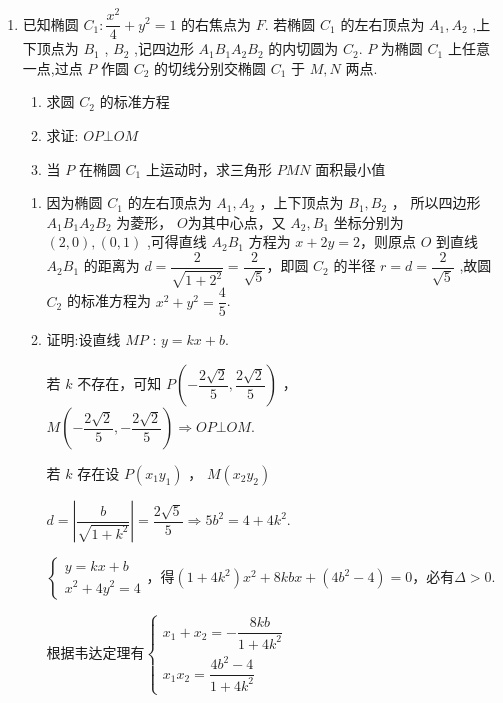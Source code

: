 \begin{enumerate}
\begin{jieda}
\begin{enumerate}
        \end{enumerate}
    \end{jieda}
    \item 已知椭圆 ${C}_1 : \dfrac{{x}^2}{4} + {y}^2 = 1$ 的右焦点为 $F$. 若椭圆 ${C}_1$ 的左右顶点为 ${A}_1,{A}_2$ ,上下顶点为 ${B}_1$ , ${B}_2$ ,记四边形 ${A}_1{B}_1{A}_2{B}_2$ 的内切圆为 ${C}_{2}$. $P$ 为椭圆 ${C}_1$ 上任意一点,过点 $P$ 作圆 ${C}_2$ 的切线分别交椭圆 ${C}_1$ 于 $M,N$ 两点.
    \begin{enumerate}
        \item 求圆 ${C}_2$ 的标准方程
        \item 求证: ${OP} \bot  {OM}$ 
        \item 当 $P$ 在椭圆 ${C}_1$ 上运动时，求三角形 ${PMN}$ 面积最小值
    \end{enumerate}
    \begin{jieda}
        \begin{enumerate}
            \item 因为椭圆 ${C}_1$ 的左右顶点为 ${A}_1,{A}_2$ ，上下顶点为 ${B}_1,{B}_2$ ， 所以四边形 ${A}_1{B}_1{A}_2{B}_2$ 为菱形， $O$为其中心点，又 ${A}_2,{B}_1$ 坐标分别为 $\left( {2,0}\right) ,\left( {0,1}\right)$ ,可得直线 ${A}_2{B}_1$ 方程为 $x + {2y} = 2$，则原点 $O$ 到直线 ${A}_2{B}_1$ 的距离为 $d = \dfrac{2}{\sqrt{1 + {2}^2}} = \dfrac{2}{\sqrt{5}}$，即圆 ${C}_2$ 的半径 $r = d = \dfrac{2}{\sqrt{5}}$ ,故圆 ${C}_2$ 的标准方程为 ${x}^2 + {y}^2 = \dfrac{4}{5}$.
            \item 证明:设直线 ${MP}$ : $y = {kx} + b$. 
            
            若 $k$ 不存在，可知 $P\left( {-\dfrac{2\sqrt{2} }{5},\dfrac{2\sqrt{2} }{5}}\right)$ ， $M\left( {-\dfrac{2\sqrt{2} }{5}, - \dfrac{2\sqrt{2}}{5}}\right)  \Longrightarrow  {OP}\bot {OM}$. 
            
            若 $k$ 存在设 $P\left( {{x}_1{y}_1}\right)$ ， $M\left( {{x}_2{y}_2}\right)$
            
            $d= \left| \dfrac{b}{\sqrt{1 + {k}^2}}\right|  = \dfrac{2\sqrt{5}}{5} \Longrightarrow  5{b}^2 = 4 + 4{k}^{2}.$
            
            $\left\{  \begin{array}{l} 
                y = {kx} + b \\  
                {x}^{2} + 4{y}^{2} = 4
            \end{array}\right.$，得$(1+4k^2)x^2 + 8kbx + \left( {4{b}^{2} - 4}\right) = 0$，必有$\Delta > 0.$
            
            根据韦达定理有$\left\{  \begin{matrix} {x}_1 + {x}_2 =  - \dfrac{{8k}b}{1 + 4k^2} \\  {x}_1{x}_2 = \dfrac{4b^2 - 4}{1 + 4k^2} \end{matrix}\right.$
            

\end{enumerate}
\end{jieda}
\end{enumerate}

